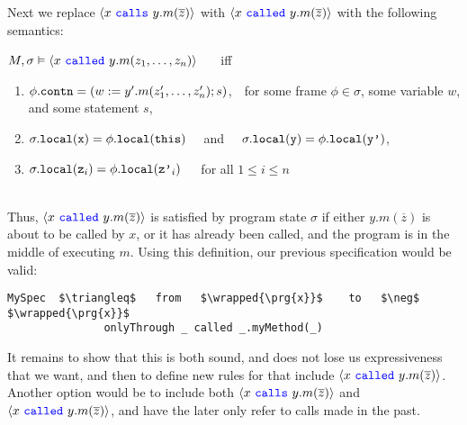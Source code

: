 \documentclass[11pt]{article} %
\begin{document}
Next we replace $\langle x\ {\color{blue}\texttt{calls}}\ y.m(\overline{z}) \rangle$ with $\langle x\ {\color{blue}\texttt{called}}\ y.m(\overline{z}) \rangle$
with the following semantics:
\\
\begin{minipage}{\linewidth}
$M , \sigma \vDash \langle x\ {\color{blue}\texttt{called}}\ y.m(z_1, \ldots, z_n) \rangle$ \ \ \ iff \ \ \ 
\begin{enumerate}
\item
$\phi.{\texttt{contn}} = (w := y'.m(z'_1,\ldots,z'_n); s)$,\ \ for some 
frame $\phi \in \sigma$,
some variable $w$, and some statement $s$,
\item
$\sigma.{\texttt{local}}({\texttt{x}}) = \phi.{\texttt{local}}({\texttt{this}})$
\ \ and \ \ 
$\sigma.{\texttt{local}}({\texttt{y}}) = \phi.{\texttt{local}}({\texttt{y'}})$,
\item
$\sigma.{\texttt{local}}({\texttt{z}}_i) = \phi.{\texttt{local}}({\texttt{z'}}_i)$\ \ \ for all $1\!\leq i\!\leq n$
\end{enumerate}
\end{minipage}\\
Thus, $\langle x\ {\color{blue}\texttt{called}}\ y.m(\overline{z}) \rangle$ is satisfied by program state
$\sigma$ if either $y.m(\overline{z})$ is about to be called by $x$,
or it has already been called, and the program is in the middle of 
executing $m$. Using this definition, our previous specification would
be valid:
\begin{lstlisting}[language = Chainmail, mathescape=true, frame=lines]
   MySpec  $\triangleq$   from   $\wrapped{\prg{x}}$    to   $\neg$ $\wrapped{\prg{x}}$
               onlyThrough _ called _.myMethod(_)
\end{lstlisting}
It remains to show that this is both sound, and does not lose 
us expressiveness that we want, and then to define new rules for 
\Nec that include $\langle x\ {\color{blue}\texttt{called}}\ y.m(\overline{z}) \rangle$. Another option would be to 
include both $\langle x\ {\color{blue}\texttt{calls}}\ y.m(\overline{z}) \rangle$ and $\langle x\ {\color{blue}\texttt{called}}\ y.m(\overline{z}) \rangle$,
and have the later only refer to calls made in the past.
\end{document}
